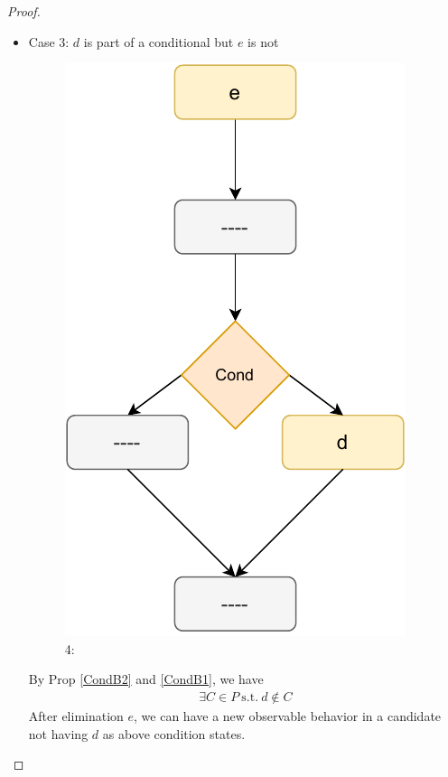 \begin{proof}
\begin{itemize}
                \item Case 3: $d$ is part of a conditional but $e$ is not

                    \begin{figure}[H]
                        \centering 
                        \includegraphics[scale=0.7]{Elimination/ConditionalsProofFig5.pdf}
                        \caption{4:}    
                    \end{figure}

                    By Prop \ref{CondB2} and \ref{CondB1}, we have 
                    \begin{align*}
                        \exists C \in P \ \text{s.t.} \ d \notin C
                    \end{align*}
                    After elimination $e$, we can have a new observable behavior in a candidate not having $d$ as above condition states. 



\end{itemize}
\end{proof}
